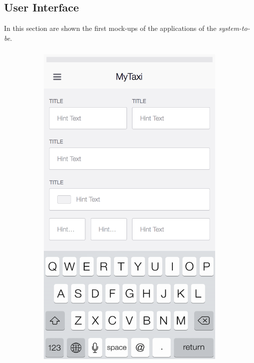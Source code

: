\graphicspath{ {../mockup/} }
\subsection{User Interface} %
In this section are shown the first mock-ups of the applications of the \emph{system-to-be}.

\subsubsection{ }
\begin{figure}
    \centering
    \begin{subfigure}[b]{0.25\textwidth}
            \includegraphics[width=\textwidth]{mobileapppng/Register}

\end{subfigure}
\end{figure}
